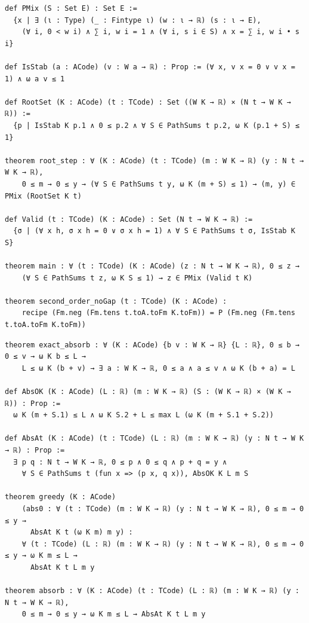\label{lean:decompose}
\begin{lstlisting}
def PMix (S : Set E) : Set E :=
  {x | ∃ (ι : Type) (_ : Fintype ι) (w : ι → ℝ) (s : ι → E),
    (∀ i, 0 < w i) ∧ ∑ i, w i = 1 ∧ (∀ i, s i ∈ S) ∧ x = ∑ i, w i • s i}

def IsStab (a : ACode) (v : W a → ℝ) : Prop := (∀ x, v x = 0 ∨ v x = 1) ∧ ω a v ≤ 1

def RootSet (K : ACode) (t : TCode) : Set ((W K → ℝ) × (N t → W K → ℝ)) :=
  {p | IsStab K p.1 ∧ 0 ≤ p.2 ∧ ∀ S ∈ PathSums t p.2, ω K (p.1 + S) ≤ 1}

theorem root_step : ∀ (K : ACode) (t : TCode) (m : W K → ℝ) (y : N t → W K → ℝ),
    0 ≤ m → 0 ≤ y → (∀ S ∈ PathSums t y, ω K (m + S) ≤ 1) → (m, y) ∈ PMix (RootSet K t)

def Valid (t : TCode) (K : ACode) : Set (N t → W K → ℝ) :=
  {σ | (∀ x h, σ x h = 0 ∨ σ x h = 1) ∧ ∀ S ∈ PathSums t σ, IsStab K S}

theorem main : ∀ (t : TCode) (K : ACode) (z : N t → W K → ℝ), 0 ≤ z →
    (∀ S ∈ PathSums t z, ω K S ≤ 1) → z ∈ PMix (Valid t K)

theorem second_order_noGap (t : TCode) (K : ACode) :
    recipe (Fm.neg (Fm.tens t.toA.toFm K.toFm)) = P (Fm.neg (Fm.tens t.toA.toFm K.toFm))
\end{lstlisting}

\label{lean:absorb}
\begin{lstlisting}
theorem exact_absorb : ∀ (K : ACode) {b v : W K → ℝ} {L : ℝ}, 0 ≤ b → 0 ≤ v → ω K b ≤ L →
    L ≤ ω K (b + v) → ∃ a : W K → ℝ, 0 ≤ a ∧ a ≤ v ∧ ω K (b + a) = L

def AbsOK (K : ACode) (L : ℝ) (m : W K → ℝ) (S : (W K → ℝ) × (W K → ℝ)) : Prop :=
  ω K (m + S.1) ≤ L ∧ ω K S.2 + L ≤ max L (ω K (m + S.1 + S.2))

def AbsAt (K : ACode) (t : TCode) (L : ℝ) (m : W K → ℝ) (y : N t → W K → ℝ) : Prop :=
  ∃ p q : N t → W K → ℝ, 0 ≤ p ∧ 0 ≤ q ∧ p + q = y ∧
    ∀ S ∈ PathSums t (fun x => (p x, q x)), AbsOK K L m S

theorem greedy (K : ACode)
    (abs0 : ∀ (t : TCode) (m : W K → ℝ) (y : N t → W K → ℝ), 0 ≤ m → 0 ≤ y →
      AbsAt K t (ω K m) m y) :
    ∀ (t : TCode) (L : ℝ) (m : W K → ℝ) (y : N t → W K → ℝ), 0 ≤ m → 0 ≤ y → ω K m ≤ L →
      AbsAt K t L m y

theorem absorb : ∀ (K : ACode) (t : TCode) (L : ℝ) (m : W K → ℝ) (y : N t → W K → ℝ),
    0 ≤ m → 0 ≤ y → ω K m ≤ L → AbsAt K t L m y
\end{lstlisting}

